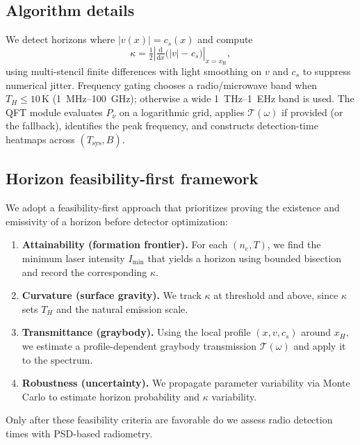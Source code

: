 \documentclass[11pt]{article}
\begin{document}
\subsection{Algorithm details}
We detect horizons where $|v(x)| = c_s(x)$ and compute
\begin{equation}
  \kappa = \tfrac{1}{2} \left|\tfrac{\mathrm{d}}{\mathrm{d}x}\big(|v| - c_s\big)\right|_{x=x_\mathrm{H}},
\end{equation}
using multi-stencil finite differences with light smoothing on $v$ and $c_s$ to suppress numerical jitter. Frequency gating chooses a radio/microwave band when $T_H\!\le\!10\,$K (\SI{1}{MHz}--\SI{100}{GHz}); otherwise a wide \SI{1}{THz}--\SI{1}{EHz} band is used. The QFT module evaluates $P_{\nu}$ on a logarithmic grid, applies $\mathcal{T}(\omega)$ if provided (or the fallback), identifies the peak frequency, and constructs detection-time heatmaps across $(T_{\mathrm{sys}}, B)$.

\subsection{Horizon feasibility-first framework}
We adopt a feasibility-first approach that prioritizes proving the existence and emissivity of a horizon before detector optimization:
\begin{enumerate}
  \item \textbf{Attainability (formation frontier).} For each $(n_e, T)$, we find the minimum laser intensity $I_{\min}$ that yields a horizon using bounded bisection and record the corresponding $\kappa$.
  \item \textbf{Curvature (surface gravity).} We track $\kappa$ at threshold and above, since $\kappa$ sets $T_H$ and the natural emission scale.
  \item \textbf{Transmittance (graybody).} Using the local profile $(x, v, c_s)$ around $x_H$, we estimate a profile-dependent graybody transmission $\mathcal{T}(\omega)$ and apply it to the spectrum.
  \item \textbf{Robustness (uncertainty).} We propagate parameter variability via Monte Carlo to estimate horizon probability and $\kappa$ variability.
\end{enumerate}
Only after these feasibility criteria are favorable do we assess radio detection times with PSD-based radiometry.
\end{document}
